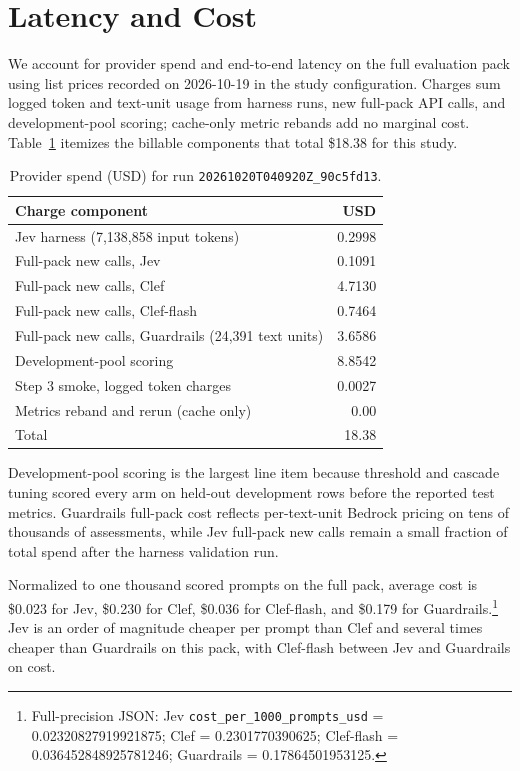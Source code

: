 \section{Latency and Cost}
\label{sec:latency}

We account for provider spend and end-to-end latency on the full evaluation pack using list prices recorded on 2026-10-19 in the study configuration.
Charges sum logged token and text-unit usage from harness runs, new full-pack API calls, and development-pool scoring; cache-only metric rebands add no marginal cost.
Table~\ref{tab:spend} itemizes the billable components that total \$18.38 for this study.

\begin{table}[t]
  \centering
  \caption{Provider spend (USD) for run \texttt{20261020T040920Z\_90c5fd13}.}
  \label{tab:spend}
  \begin{tabular}{lr}
    \toprule
    Charge component & USD \\
    \midrule
    Jev harness (7{,}138{,}858 input tokens) & 0.2998 \\
    Full-pack new calls, Jev & 0.1091 \\
    Full-pack new calls, Clef & 4.7130 \\
    Full-pack new calls, Clef-flash & 0.7464 \\
    Full-pack new calls, Guardrails (24{,}391 text units) & 3.6586 \\
    Development-pool scoring & 8.8542 \\
    Step 3 smoke, logged token charges & 0.0027 \\
    Metrics reband and rerun (cache only) & 0.00 \\
    \midrule
    Total & 18.38 \\
    \bottomrule
  \end{tabular}
\end{table}

Development-pool scoring is the largest line item because threshold and cascade tuning scored every arm on held-out development rows before the reported test metrics.
Guardrails full-pack cost reflects per-text-unit Bedrock pricing on tens of thousands of assessments, while Jev full-pack new calls remain a small fraction of total spend after the harness validation run.

Normalized to one thousand scored prompts on the full pack, average cost is \$0.023 for Jev, \$0.230 for Clef, \$0.036 for Clef-flash, and \$0.179 for Guardrails.\footnote{Full-precision JSON: Jev \texttt{cost\_per\_1000\_prompts\_usd} = 0.02320827919921875; Clef = 0.2301770390625; Clef-flash = 0.036452848925781246; Guardrails = 0.17864501953125.}
Jev is an order of magnitude cheaper per prompt than Clef and several times cheaper than Guardrails on this pack, with Clef-flash between Jev and Guardrails on cost.

